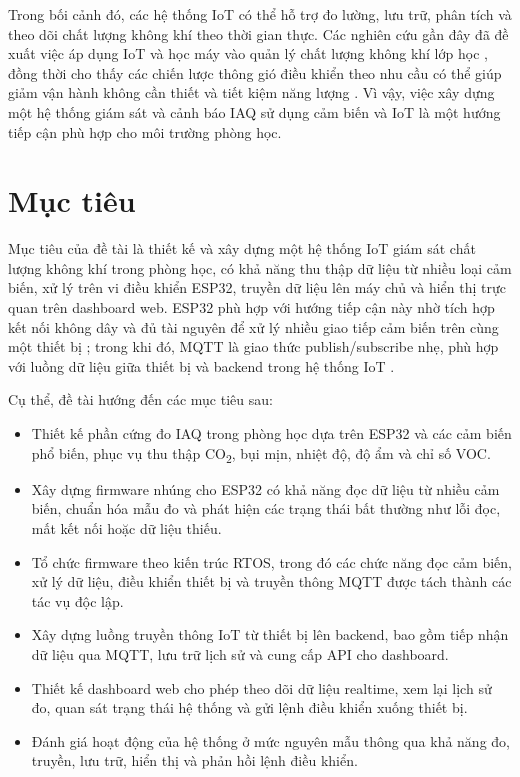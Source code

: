 Trong bối cảnh đó, các hệ thống IoT có thể hỗ trợ đo lường, lưu trữ, phân tích và theo
dõi chất lượng không khí theo thời gian thực. Các nghiên cứu gần đây đã đề xuất việc áp
dụng IoT và học máy vào quản lý chất lượng không khí lớp học \cite{renold2025}, đồng
thời cho thấy các chiến lược thông gió điều khiển theo nhu cầu có thể giúp giảm vận
hành không cần thiết và tiết kiệm năng lượng \cite{merema2018}. Vì vậy, việc xây dựng
một hệ thống giám sát và cảnh báo IAQ sử dụng cảm biến và IoT là một hướng tiếp cận phù
hợp cho môi trường phòng học.

\section{Mục tiêu}

Mục tiêu của đề tài là thiết kế và xây dựng một hệ thống IoT giám sát chất lượng không
khí trong phòng học, có khả năng thu thập dữ liệu từ nhiều loại cảm biến, xử lý trên vi
điều khiển ESP32, truyền dữ liệu lên máy chủ và hiển thị trực quan trên dashboard web.
ESP32 phù hợp với hướng tiếp cận này nhờ tích hợp kết nối không dây và đủ tài nguyên để
xử lý nhiều giao tiếp cảm biến trên cùng một thiết bị \cite{esp32soc}; trong khi đó,
MQTT là giao thức publish/subscribe nhẹ, phù hợp với luồng dữ liệu giữa thiết bị và
backend trong hệ thống IoT \cite{oasismqtt,mqttorg}.

Cụ thể, đề tài hướng đến các mục tiêu sau:

\begin{itemize}[leftmargin=2em]
    \item Thiết kế phần cứng đo IAQ trong phòng học dựa trên ESP32 và các cảm biến phổ
    biến, phục vụ thu thập CO\textsubscript{2}, bụi mịn, nhiệt độ, độ ẩm và chỉ số VOC.
    \item Xây dựng firmware nhúng cho ESP32 có khả năng đọc dữ liệu từ nhiều cảm biến,
    chuẩn hóa mẫu đo và phát hiện các trạng thái bất thường như lỗi đọc, mất kết nối
    hoặc dữ liệu thiếu.
    \item Tổ chức firmware theo kiến trúc RTOS, trong đó các chức năng đọc cảm biến, xử
    lý dữ liệu, điều khiển thiết bị và truyền thông MQTT được tách thành các tác vụ độc
    lập.
    \item Xây dựng luồng truyền thông IoT từ thiết bị lên backend, bao gồm tiếp nhận dữ
    liệu qua MQTT, lưu trữ lịch sử và cung cấp API cho dashboard.
    \item Thiết kế dashboard web cho phép theo dõi dữ liệu realtime, xem lại lịch sử đo,
    quan sát trạng thái hệ thống và gửi lệnh điều khiển xuống thiết bị.
    \item Đánh giá hoạt động của hệ thống ở mức nguyên mẫu thông qua khả năng đo, truyền,
    lưu trữ, hiển thị và phản hồi lệnh điều khiển.
\end{itemize}

